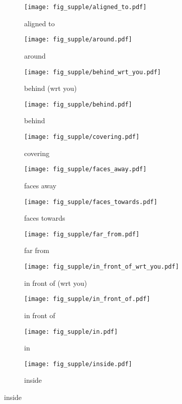 \documentclass{article}
\begin{document}
\begin{figure}[h]
\centering
\begin{subfigure}{0.22\linewidth}
\texttt{[image: fig\_supple/aligned\_to.pdf]}
\caption{aligned to}
\end{subfigure}
\begin{subfigure}{0.22\linewidth}
\texttt{[image: fig\_supple/around.pdf]}
\caption{around}
\end{subfigure}
\begin{subfigure}{0.22\linewidth}
\texttt{[image: fig\_supple/behind\_wrt\_you.pdf]}
\caption{behind (wrt you)}
\end{subfigure}
\begin{subfigure}{0.22\linewidth}
\texttt{[image: fig\_supple/behind.pdf]}
\caption{behind}
\end{subfigure}
\begin{subfigure}{0.22\linewidth}
\texttt{[image: fig\_supple/covering.pdf]}
\caption{covering}
\end{subfigure}
\begin{subfigure}{0.22\linewidth}
\texttt{[image: fig\_supple/faces\_away.pdf]}
\caption{faces away}
\end{subfigure}
\begin{subfigure}{0.22\linewidth}
\texttt{[image: fig\_supple/faces\_towards.pdf]}
\caption{faces towards}
\end{subfigure}
\begin{subfigure}{0.22\linewidth}
\texttt{[image: fig\_supple/far\_from.pdf]}
\caption{far from}
\end{subfigure}
\begin{subfigure}{0.22\linewidth}
\texttt{[image: fig\_supple/in\_front\_of\_wrt\_you.pdf]}
\caption{in front of (wrt you)}
\end{subfigure}
\begin{subfigure}{0.22\linewidth}
\texttt{[image: fig\_supple/in\_front\_of.pdf]}
\caption{in front of}
\end{subfigure}
\begin{subfigure}{0.22\linewidth}
\texttt{[image: fig\_supple/in.pdf]}
\caption{in}
\end{subfigure}
\begin{subfigure}{0.22\linewidth}
\texttt{[image: fig\_supple/inside.pdf]}
\caption{inside}
\end{subfigure}

\end{figure}
\end{document}
